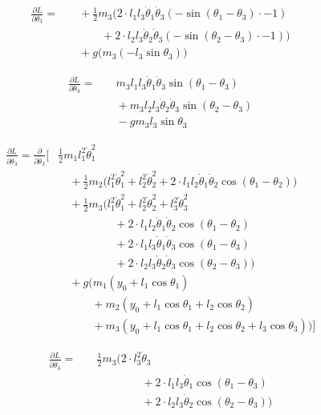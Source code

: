 \documentclass[11pt,a4paper]{article}
\begin{document}
\begin{align*}
    \frac{\partial L}{\partial \theta_3} = 
    &\quad + \frac{1}{2} m_3 \big(2 \cdot l_1 l_3 \dot{\theta}_1 \dot{\theta}_3 (- \sin(\theta_1 - \theta_3) \cdot -1) \\
        &\qquad\quad + 2 \cdot l_2 l_3 \dot{\theta}_2 \dot{\theta}_3 (- \sin(\theta_2 - \theta_3) \cdot -1) \big) \\
    &\quad + g \big( m_3 (-l_3 \sin\theta_3) \big)
\end{align*}

\begin{align*}
    \frac{\partial L}{\partial \theta_3} = 
    &\quad m_3 l_1 l_3 \dot{\theta}_1 \dot{\theta}_3 \sin(\theta_1 - \theta_3) \\
    &\quad + m_3 l_2 l_3 \dot{\theta}_2 \dot{\theta}_3 \sin(\theta_2 - \theta_3) \\
    &\quad - g m_3 l_3 \sin\theta_3
\end{align*}


\begin{align*}
    \frac{\partial L}{\partial \dot\theta_3} = \frac{\partial}{\partial \dot\theta_3} \Biggl[
    &\frac{1}{2} m_1 l_1^2 \dot{\theta}_1^2 \\
    &\quad + \frac{1}{2} m_2 \big( l_1^2 \dot{\theta}_1^2 + l_2^2 \dot{\theta}_2^2 + 2 \cdot l_1 l_2 \dot{\theta}_1 \dot{\theta}_2 \cos(\theta_1 - \theta_2) \big) \\
    &\quad + \frac{1}{2} m_3 \big( l_1^2 \dot{\theta}_1^2 + l_2^2 \dot{\theta}_2^2 + l_3^2 \dot{\theta}_3^2 \\
        &\qquad\qquad\quad + 2 \cdot l_1 l_2 \dot{\theta}_1 \dot{\theta}_2 \cos(\theta_1 - \theta_2) \\
        &\qquad\qquad\quad + 2 \cdot l_1 l_3 \dot{\theta}_1 \dot{\theta}_3 \cos(\theta_1 - \theta_3) \\
        &\qquad\qquad\quad + 2 \cdot l_2 l_3 \dot{\theta}_2 \dot{\theta}_3 \cos(\theta_2 - \theta_3) \big) \\
    &\quad + g \big( m_1 (y_0 + l_1 \cos\theta_1) \\
        &\qquad\quad + m_2 (y_0 + l_1 \cos\theta_1 + l_2 \cos\theta_2) \\
        &\qquad\quad + m_3 (y_0 + l_1 \cos\theta_1 + l_2 \cos\theta_2 + l_3 \cos\theta_3) \big) \Biggr]
\end{align*}

\begin{align*}
    \frac{\partial L}{\partial \dot\theta_3} =
    &\quad \frac{1}{2} m_3 \big(2 \cdot l_3^2 \dot{\theta}_3 \\
        &\qquad\qquad\quad + 2 \cdot l_1 l_3 \dot{\theta}_1 \cos(\theta_1 - \theta_3) \\
        &\qquad\qquad\quad + 2 \cdot l_2 l_3 \dot{\theta}_2 \cos(\theta_2 - \theta_3) \big) \\
\end{align*}
\end{document}
